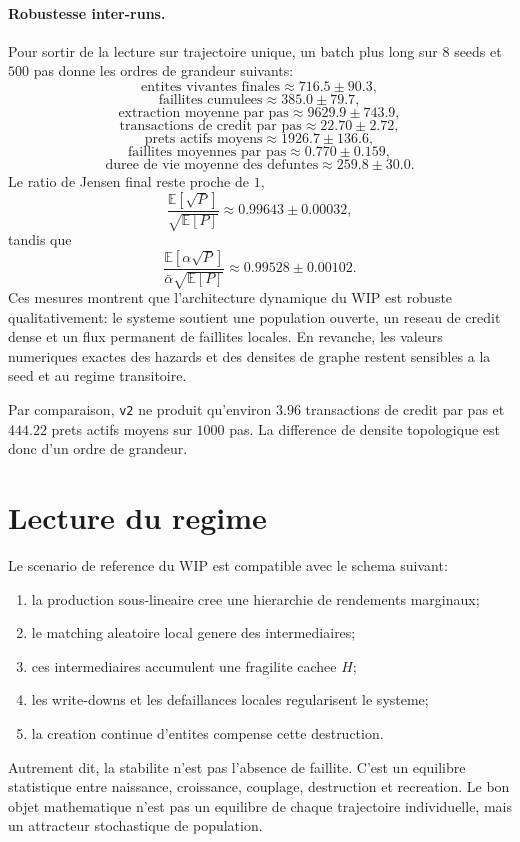 \documentclass[11pt,a4paper]{article}
\begin{document}
\paragraph{Robustesse inter-runs.}
Pour sortir de la lecture sur trajectoire unique, un batch plus long sur $8$ seeds et $500$ pas donne les ordres de grandeur suivants:
\[
\text{entites vivantes finales} \approx 716.5 \pm 90.3,
\]
\[
\text{faillites cumulees} \approx 385.0 \pm 79.7,
\]
\[
\text{extraction moyenne par pas} \approx 9629.9 \pm 743.9,
\]
\[
\text{transactions de credit par pas} \approx 22.70 \pm 2.72,
\]
\[
\text{prets actifs moyens} \approx 1926.7 \pm 136.6,
\]
\[
\text{faillites moyennes par pas} \approx 0.770 \pm 0.159,
\]
\[
\text{duree de vie moyenne des defuntes} \approx 259.8 \pm 30.0.
\]
Le ratio de Jensen final reste proche de $1$,
\[
\frac{\mathbb E[\sqrt P]}{\sqrt{\mathbb E[P]}} \approx 0.99643 \pm 0.00032,
\]
tandis que
\[
\frac{\mathbb E[\alpha\sqrt P]}{\bar\alpha\sqrt{\mathbb E[P]}}
\approx
0.99528 \pm 0.00102.
\]
Ces mesures montrent que l'architecture dynamique du WIP est robuste qualitativement: le systeme soutient une population ouverte, un reseau de credit dense et un flux permanent de faillites locales. En revanche, les valeurs numeriques exactes des hazards et des densites de graphe restent sensibles a la seed et au regime transitoire.

Par comparaison, \texttt{v2} ne produit qu'environ $3.96$ transactions de credit par pas et $444.22$ prets actifs moyens sur $1000$ pas. La difference de densite topologique est donc d'un ordre de grandeur.

\section{Lecture du regime}
Le scenario de reference du WIP est compatible avec le schema suivant:
\begin{enumerate}
\item la production sous-lineaire cree une hierarchie de rendements marginaux;
\item le matching aleatoire local genere des intermediaires;
\item ces intermediaires accumulent une fragilite cachee $H$;
\item les write-downs et les defaillances locales regularisent le systeme;
\item la creation continue d'entites compense cette destruction.
\end{enumerate}

Autrement dit, la stabilite n'est pas l'absence de faillite. C'est un equilibre statistique entre naissance, croissance, couplage, destruction et recreation. Le bon objet mathematique n'est pas un equilibre de chaque trajectoire individuelle, mais un attracteur stochastique de population.
\end{document}
